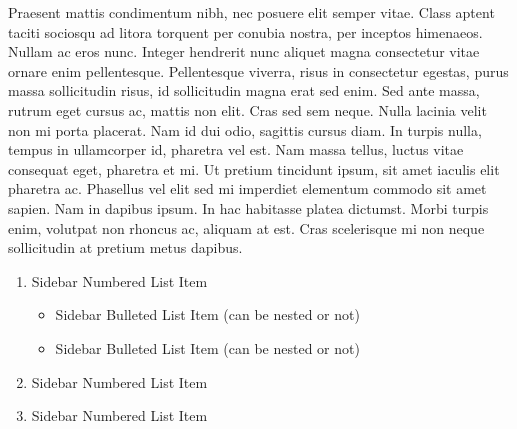 \begin{shaded}
Praesent mattis condimentum nibh, nec posuere elit semper vitae. Class aptent taciti sociosqu ad litora torquent per conubia nostra, per inceptos himenaeos. Nullam ac eros nunc. Integer hendrerit nunc aliquet magna consectetur vitae ornare enim pellentesque. Pellentesque viverra, risus in consectetur egestas, purus massa sollicitudin risus, id sollicitudin magna erat sed enim. Sed ante massa, rutrum eget cursus ac, mattis non elit. Cras sed sem neque. Nulla lacinia velit non mi porta placerat. Nam id dui odio, sagittis cursus diam. In turpis nulla, tempus in ullamcorper id, pharetra vel est. Nam massa tellus, luctus vitae consequat eget, pharetra et mi. Ut pretium tincidunt ipsum, sit amet iaculis elit pharetra ac. Phasellus vel elit sed mi imperdiet elementum commodo sit amet sapien. Nam in dapibus ipsum. In hac habitasse platea dictumst. Morbi turpis enim, volutpat non rhoncus ac, aliquam at est. Cras scelerisque mi non neque sollicitudin at pretium metus dapibus.
\begin{enumerate}
\item{Sidebar Numbered List Item}
\begin{itemize}
\item{Sidebar Bulleted List Item (can be nested or not)}
\item{Sidebar Bulleted List Item (can be nested or not)}
\end{itemize}
\item{Sidebar Numbered List Item}
\item{Sidebar Numbered List Item}
\end{enumerate}


\end{shaded}
